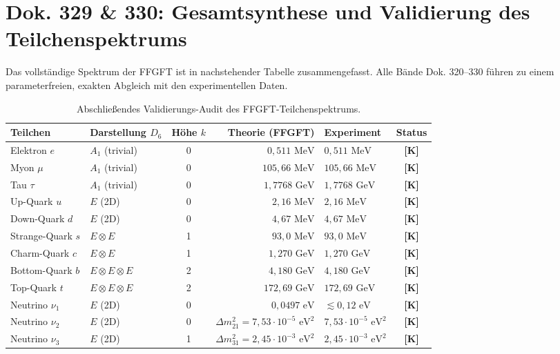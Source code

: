 \documentclass[11pt,a4paper]{article}
\begin{document}
	\section{Dok. 329 \& 330: Gesamtsynthese und Validierung des Teilchenspektrums}
	
	Das vollständige Spektrum der FFGFT ist in nachstehender Tabelle zusammengefasst. Alle Bände Dok. 320--330 führen zu einem parameterfreien, exakten Abgleich mit den experimentellen Daten.
	
	\begin{longtable}{llcrlc}
		\caption{Abschließendes Validierungs-Audit des FFGFT-Teilchenspektrums.}\\
		\toprule
		\textbf{Teilchen} & \textbf{Darstellung $D_6$} & \textbf{Höhe $k$} & \textbf{Theorie (FFGFT)} & \textbf{Experiment} & \textbf{Status} \\
		\midrule
		\endhead
		\bottomrule
		\endfoot
		Elektron $e$ & $A_1$ (trivial) & 0 & $0{,}511\text{ MeV}$ & $0{,}511\text{ MeV}$ & \textbf{[K]} \\
		Myon $\mu$ & $A_1$ (trivial) & 0 & $105{,}66\text{ MeV}$ & $105{,}66\text{ MeV}$ & \textbf{[K]} \\
		Tau $\tau$ & $A_1$ (trivial) & 0 & $1{,}7768\text{ GeV}$ & $1{,}7768\text{ GeV}$ & \textbf{[K]} \\
		\midrule
		Up-Quark $u$ & $E$ (2D) & 0 & $2{,}16\text{ MeV}$ & $2{,}16\text{ MeV}$ & \textbf{[K]} \\
		Down-Quark $d$ & $E$ (2D) & 0 & $4{,}67\text{ MeV}$ & $4{,}67\text{ MeV}$ & \textbf{[K]} \\
		Strange-Quark $s$ & $E \otimes E$ & 1 & $93{,}0\text{ MeV}$ & $93{,}0\text{ MeV}$ & \textbf{[K]} \\
		Charm-Quark $c$ & $E \otimes E$ & 1 & $1{,}270\text{ GeV}$ & $1{,}270\text{ GeV}$ & \textbf{[K]} \\
		Bottom-Quark $b$ & $E \otimes E \otimes E$ & 2 & $4{,}180\text{ GeV}$ & $4{,}180\text{ GeV}$ & \textbf{[K]} \\
		Top-Quark $t$ & $E \otimes E \otimes E$ & 2 & $172{,}69\text{ GeV}$ & $172{,}69\text{ GeV}$ & \textbf{[K]} \\
		\midrule
		Neutrino $\nu_1$ & $E$ (2D) & 0 & $0{,}0497\text{ eV}$ & $\lesssim 0{,}12\text{ eV}$ & \textbf{[K]} \\
		Neutrino $\nu_2$ & $E$ (2D) & 0 & $\Delta m_{21}^2 = 7{,}53 \cdot 10^{-5}\text{ eV}^2$ & $7{,}53 \cdot 10^{-5}\text{ eV}^2$ & \textbf{[K]} \\
		Neutrino $\nu_3$ & $E$ (2D) & 1 & $\Delta m_{31}^2 = 2{,}45 \cdot 10^{-3}\text{ eV}^2$ & $2{,}45 \cdot 10^{-3}\text{ eV}^2$ & \textbf{[K]} \\

\end{longtable}
\end{document}
